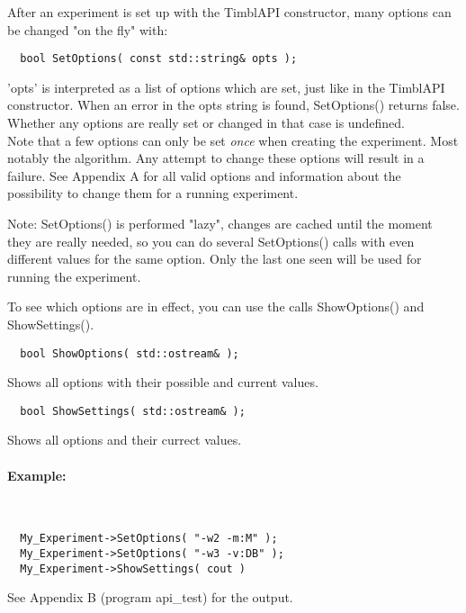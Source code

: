 After an experiment is set up with the TimblAPI constructor, many
options can be changed "on the fly" with:

\begin{verbatim}
  bool SetOptions( const std::string& opts );
\end{verbatim}

'opts' is interpreted as a list of options which are set, just like in
the TimblAPI constructor. When an error in the opts string is found,
SetOptions() returns false. Whether any options are really set or
changed in that case is undefined. \\
Note that a few options can only be set {\em once} when creating the
experiment. Most notably the algorithm. Any attempt to change these
options will result in a failure.
See Appendix A for all valid options and information about the
possibility to change them for a running experiment.

Note: SetOptions() is performed "lazy", changes are cached until the
moment they are really needed, so you can do several SetOptions()
calls with even different values for the same option. Only the last
one seen will be used for running the experiment.

To see which options are in effect, you can use the calls ShowOptions()
and ShowSettings().

\begin{verbatim}
  bool ShowOptions( std::ostream& );
\end{verbatim}

Shows all options with their possible and current values.

\begin{verbatim}
  bool ShowSettings( std::ostream& );
\end{verbatim}

Shows all options and their currect values.\\

\paragraph{Example:}\ \\

\begin{verbatim}
  My_Experiment->SetOptions( "-w2 -m:M" );
  My_Experiment->SetOptions( "-w3 -v:DB" );
  My_Experiment->ShowSettings( cout )
\end{verbatim}

See Appendix B (program api\_test) for the output.

